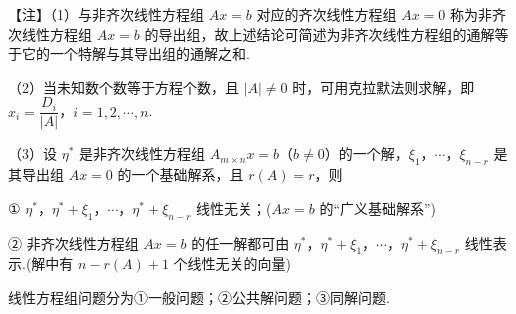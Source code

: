 \begin{fnote}
【注】（1）与非齐次线性方程组 $Ax=b$ 对应的齐次线性方程组 $Ax=0$ 称为非齐次线性方程组 $Ax=b$ 的导出组，故上述结论可简述为非齐次线性方程组的通解等于它的一个特解与其导出组的通解之和.


（2）当未知数个数等于方程个数，且 $|A|\ne0$ 时，可用克拉默法则求解，即 $x_i=\dfrac{D_i}{|A|}$，$i=1,2,\cdots,n$.

（3）设 $\eta^*$ 是非齐次线性方程组 $A_{m\times n}x=b$（$b\ne0$）的一个解，$\xi_1$，$\cdots$，$\xi_{n-r}$ 是其导出组 $Ax=0$ 的一个基础解系，且 $r(A)=r$，则

① $\eta^*$，$\eta^*+\xi_1$，$\cdots$，$\eta^*+\xi_{n-r}$ 线性无关；\quad($Ax=b$ 的“广义基础解系”)

② 非齐次线性方程组 $Ax=b$ 的任一解都可由 $\eta^*$，$\eta^*+\xi_1$，$\cdots$，$\eta^*+\xi_{n-r}$ 线性表示.\quad(解中有 $n-r(A)+1$ 个线性无关的向量)
\end{fnote}


线性方程组问题分为①一般问题；②公共解问题；③同解问题.


